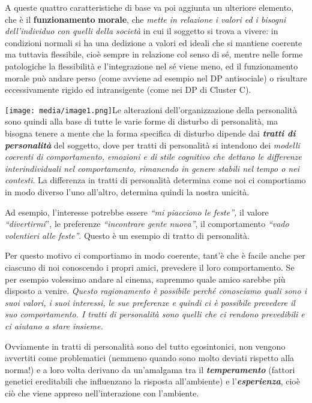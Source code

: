 \documentclass[]{article}
\begin{document}
A queste quattro caratteristiche di base va poi aggiunta un ulteriore
elemento, che è il \textbf{funzionamento} \textbf{morale}, che
\emph{mette in relazione i valori ed i bisogni dell'individuo con quelli
della società} in cui il soggetto si trova a vivere: in condizioni
normali si ha una dedizione a valori ed ideali che si mantiene coerente
ma tuttavia flessibile, cioè sempre in relazione col senso di sé, mentre
nelle forme patologiche la flessibilità e l'integrazione nel sé viene
meno, ed il funzionamento morale può andare perso (come avviene ad
esempio nel DP antisociale) o risultare eccessivamente rigido ed
intransigente (come nei DP di Cluster C).

\texttt{[image: media/image1.png]}Le
alterazioni dell'organizzazione della personalità sono quindi alla base
di tutte le varie forme di disturbo di personalità, ma bisogna tenere a
mente che la forma specifica di disturbo dipende dai
\textbf{\emph{tratti di personalità}} del soggetto, dove per tratti di
personalità si intendono dei \emph{modelli coerenti di comportamento,
emozioni e di stile cognitivo che dettano le differenze interindividuali
nel comportamento, rimanendo in genere stabili nel tempo o nei
contesti}. La differenza in tratti di personalità determina come noi ci
comportiamo in modo diverso l'uno all'altro, determina quindi la nostra
unicità.

Ad esempio, l'interesse potrebbe essere \emph{``mi piacciono le
feste'',} il valore \emph{``divertirmi}'', le preferenze
\emph{``incontrare gente nuova''}, il comportamento \emph{``vado
volentieri alle feste''}. Questo è un esempio di tratto di personalità.

Per questo motivo ci comportiamo in modo coerente, tant'è che è facile
anche per ciascuno di noi conoscendo i propri amici, prevedere il loro
comportamento. Se per esempio volessimo andare al cinema, sapremmo quale
amico sarebbe più disposto a venire. \emph{\emph{Questo ragionamento è
possibile perché conosciamo quali sono i suoi valori, i suoi interessi,
le sue preferenze e quindi ci è possibile prevedere il suo
comportamento. I tratti di personalità sono quelli che ci rendono
prevedibili e ci aiutano a stare insieme. }}

Ovviamente in tratti di personalità sono del tutto egosintonici, non
vengono avvertiti come problematici (nemmeno quando sono molto deviati
rispetto alla norma!) e a loro volta derivano da un'amalgama tra il
\textbf{\emph{temperamento}} (fattori genetici ereditabili che
influenzano la risposta all'ambiente) e l'\textbf{\emph{esperienza}},
cioè ciò che viene appreso nell'interazione con l'ambiente.
\end{document}
